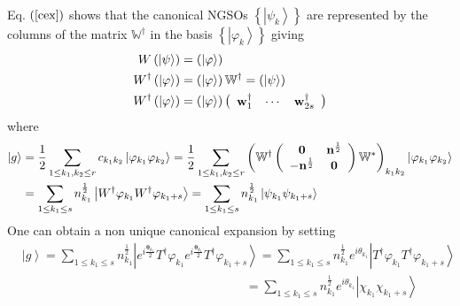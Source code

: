 \documentclass[aps,preprint]{revtex4}%
\begin{document}
Eq. $\left(  \ref{cex}\right)  $ shows that the canonical NGSOs $\left\{
\left\vert \psi_{k}\right\rangle \right\}  $ are represented by the columns of
the matrix $\mathbb{W}^{\dagger}$ in the basis $\left\{  \left\vert
\varphi_{k}\right\rangle \right\}  $ giving
\begin{align}
W\left(  \left\vert \mathbf{\psi}\right\rangle \right)   &  =\left(
\left\vert \mathbf{\varphi}\right\rangle \right) \nonumber\\
W^{\dagger}\left(  \left\vert \mathbf{\varphi}\right\rangle \right)   &
=\left(  \left\vert \mathbf{\varphi}\right\rangle \right)  \mathbb{W}%
^{\dagger}=\left(  \left\vert \mathbf{\psi}\right\rangle \right) \nonumber\\
W^{\dagger}\left(  \left\vert \mathbf{\varphi}\right\rangle \right)   &
=\left(  \left\vert \mathbf{\varphi}\right\rangle \right)  \left(
\begin{array}
[c]{ccc}%
\mathbf{w}_{1}^{\dagger} & \cdots & \mathbf{w}_{2s}^{\dagger}%
\end{array}
\right)
\end{align}
where
\begin{align}
\left\vert g\right\rangle  &  =\frac{1}{2}\sum_{1\leq k_{1},k_{2}\leq
r}c_{k_{1}k_{2}}\left\vert \varphi_{k_{1}}\varphi_{k_{2}}\right\rangle
=\frac{1}{2}\sum_{1\leq k_{1},k_{2}\leq r}\left(  \mathbb{W}^{\dagger}\left(
\begin{array}
[c]{cc}%
\mathbf{0} & \mathbf{n}^{\frac{1}{2}}\\
-\mathbf{n}^{\frac{1}{2}} & \mathbf{0}%
\end{array}
\right)  \mathbb{W}^{\ast}\right)  _{k_{1}k_{2}}\left\vert \varphi_{k_{1}%
}\varphi_{k_{2}}\right\rangle \nonumber\\
&  =\sum_{1\leq k_{1}\leq s}n_{k_{1}}^{\frac{1}{2}}\left\vert W^{\dagger
}\varphi_{k_{1}}W^{\dagger}\varphi_{k_{1}+s}\right\rangle =\sum_{1\leq
k_{1}\leq s}n_{k_{1}}^{\frac{1}{2}}\left\vert \psi_{k_{1}}\psi_{k_{1}%
+s}\right\rangle
\end{align}
One can obtain a non unique canonical expansion by setting
\begin{align}
&  \left\vert g\right\rangle =\sum_{1\leq k_{1}\leq s}n_{k_{1}}^{\frac{1}{2}%
}\left\vert e^{i\frac{\mathbf{\theta}_{k_{1}}}{2}}T^{\dagger}\varphi_{k_{1}%
}e^{i\frac{\mathbf{\theta}_{k_{1}}}{2}}T^{\dagger}\varphi_{k_{1}%
+s}\right\rangle =\sum_{1\leq k_{1}\leq s}n_{k_{1}}^{\frac{1}{2}}%
e^{i\theta_{k_{1}}}\left\vert T^{\dagger}\varphi_{k_{1}}T^{\dagger}%
\varphi_{k_{1}+s}\right\rangle \nonumber\\
&  \left.  \qquad\qquad\qquad\qquad\qquad\qquad\qquad\qquad\qquad\right.
=\sum_{1\leq k_{1}\leq s}n_{k_{1}}^{\frac{1}{2}}e^{i\theta_{k_{1}}}\left\vert
\chi_{k_{1}}\chi_{k_{1}+s}\right\rangle
\end{align}
\end{document}
